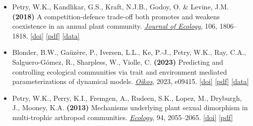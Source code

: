 \documentclass[
  letterpaper,
  DIV=11,
  numbers=noendperiod]{scrartcl}
\begin{document}
\begin{itemize}
\item
  Petry, W.K., Kandlikar, G.S., Kraft, N.J.B., Godoy, O. \& Levine, J.M.
  \textbf{(2018)} A competition-defence trade-off both promotes and
  weakens coexistence in an annual plant community. \ul{\emph{Journal of
  Ecology}}, 106, 1806--1818.
  \href{https://doi.org/10.1111/1365-2745.13028}{{[}doi{]}}
  \href{publications/Petry\%20et\%20al.\%20-\%202018\%20-\%20A\%20competition–defence\%20trade-off\%20both\%20promotes\%20and\%20.pdf}{{[}pdf{]}}
  \href{https://doi.org/10.5281/zenodo.1256658}{{[}data{]}}
\item
  Blonder, B.W., Gaüzère, P., Iversen, L.L., Ke, P.-J., Petry, W.K.,
  Ray, C.A., Salguero-Gómez, R., Sharpless, W., Violle, C.
  \textbf{(2023)} Predicting and controlling ecological communities via
  trait and environment mediated parameterizations of dynamical models.
  \ul{\emph{Oikos}}, 2023, e09415.
  \href{https://doi.org/10.1111/oik.09415}{{[}doi{]}}
  \href{publications/Blonder\%20et\%20al.\%20-\%202023\%20-\%20Predicting\%20and\%20controlling\%20ecological\%20communities\%20via\%20trait\%20and\%20environment\%20mediated\%20parameterizatio.pdf}{{[}pdf{]}}
  \href{https://zenodo.org/record/7576397}{{[}data{]}}
\item
  Petry, W.K., Perry, K.I., Fremgen, A., Rudeen, S.K., Lopez, M.,
  Dryburgh, J., Mooney, K.A. \textbf{(2013)} Mechanisms underlying plant
  sexual dimorphism in multi-trophic arthropod communities.
  \ul{\emph{Ecology}}, 94, 2055--2065.
  \href{https://doi.org/10.1890/12-2170.1}{{[}doi{]}}
  \href{publications/Petry\%20et\%20al.\%20-\%202013\%20-\%20Mechanisms\%20underlying\%20plant\%20sexual\%20dimorphism\%20in\%20m.pdf}{{[}pdf{]}}
\end{itemize}
\end{document}

